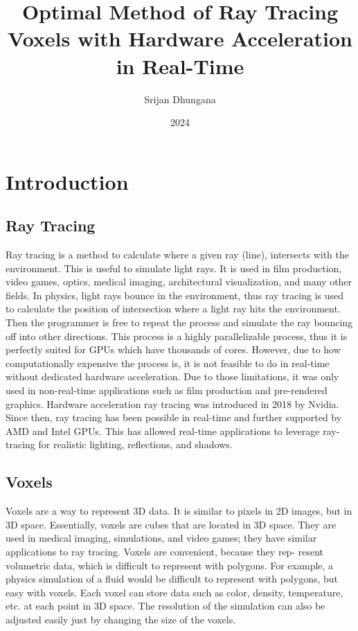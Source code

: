 \documentclass[12pt]{article}
\title{Optimal Method of Ray Tracing Voxels with Hardware Acceleration in Real-Time}
\author{Srijan Dhungana}
\date{2024}
\begin{document}
\maketitle
\clearpage

\tableofcontents
\clearpage

\section{Introduction}

\subsection{Ray Tracing}

Ray tracing is a method to calculate where a given ray (line), intersects
with the environment. This is useful to simulate light rays. It is used in film
production, video games, optics, medical imaging, architectural visualization,
and many other fields. In physics, light rays bounce in the environment, thus
ray tracing is used to calculate the position of intersection where a light ray
hits the environment. Then the programmer is free to repeat the process
and simulate the ray bouncing off into other directions. This process is a
highly parallelizable process, thus it is perfectly suited for GPUs which have
thousands of cores. However, due to how computationally expensive the
process is, it is not feasible to do in real-time without dedicated hardware
acceleration. Due to those limitations, it was only used in non-real-time
applications such as film production and pre-rendered graphics. Hardware
acceleration ray tracing was introduced in 2018 by Nvidia. Since then, ray
tracing has been possible in real-time and further supported by AMD and
Intel GPUs. This has allowed real-time applications to leverage ray-tracing
for realistic lighting, reflections, and shadows.

\subsection{Voxels}

Voxels are a way to represent 3D data. It is similar to pixels in 2D images,
but in 3D space. Essentially, voxels are cubes that are located in 3D space.
They are used in medical imaging, simulations, and video games; they have
similar applications to ray tracing. Voxels are convenient, because they rep-
resent volumetric data, which is difficult to represent with polygons. For
example, a physics simulation of a fluid would be difficult to represent with
polygons, but easy with voxels. Each voxel can store data such as color,
density, temperature, etc. at each point in 3D space. The resolution of the
simulation can also be adjusted easily just by changing the size of the voxels.
\end{document}
